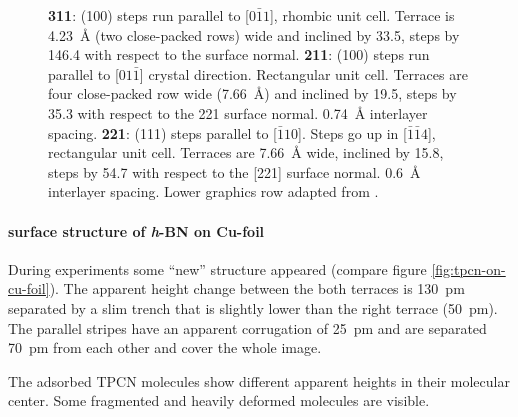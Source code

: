 \begin{figure}
{		\textbf{311}: (100) steps run parallel to [$0 \bar 1 1$], rhombic unit cell. Terrace is \SI{4,23}{\angstrom} (two close-packed rows) wide and inclined by \SI{33,5}{\deg}, steps by \SI{146,4}{\deg} with respect to the surface normal.
		\textbf{211}: (100) steps run parallel to [$0 1 \bar 1$] crystal direction. Rectangular unit cell. Terraces are four close-packed row wide (\SI{7,66}{\angstrom}) and inclined by \SI{19,5}{\deg}, steps by \SI{35,3}{\deg} with respect to the 221 surface normal. \SI{0,74}{\angstrom} interlayer spacing.
		\textbf{221}: (111) steps parallel to [$\bar 1 1 0$]. Steps go up in [$\bar 1 \bar 1 4$], rectangular unit cell. Terraces are \SI{7,66}{\angstrom} wide, inclined by \SI{15,8}{\deg}, steps by \SI{54,7}{\deg} with respect to the [221] surface normal. \SI{0,6}{\angstrom} interlayer spacing. Lower graphics row adapted from \cite{riemann_ionic_2002}.
	}
	\label{tab:step-heights}
\end{figure}

\paragraph{surface structure of \textit{h}-BN on Cu-foil}
During experiments some ``new'' structure appeared (compare figure \ref{fig:tpcn-on-cu-foil}).
The apparent height change between the both terraces is \SI{130}{\pico \meter} separated by a slim trench that is slightly lower than the right terrace (\SI{50}{\pico \meter}). The parallel stripes have an apparent corrugation of \SI{25}{\pico \meter} and are separated \SI{70}{\pico \meter} from each other and cover the whole image. 

The adsorbed TPCN molecules show different apparent heights in their molecular center. Some fragmented and heavily deformed molecules are visible.

